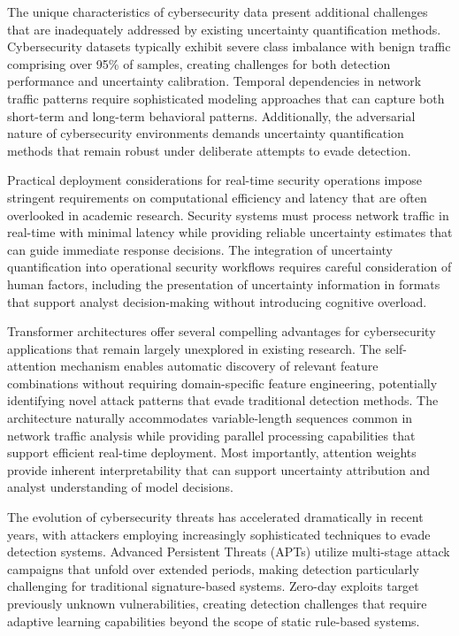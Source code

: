 \documentclass[journal]{IEEEtran}
\begin{document}
The unique characteristics of cybersecurity data present additional challenges that are inadequately addressed by existing uncertainty quantification methods. Cybersecurity datasets typically exhibit severe class imbalance with benign traffic comprising over 95\% of samples, creating challenges for both detection performance and uncertainty calibration. Temporal dependencies in network traffic patterns require sophisticated modeling approaches that can capture both short-term and long-term behavioral patterns. Additionally, the adversarial nature of cybersecurity environments demands uncertainty quantification methods that remain robust under deliberate attempts to evade detection.

Practical deployment considerations for real-time security operations impose stringent requirements on computational efficiency and latency that are often overlooked in academic research. Security systems must process network traffic in real-time with minimal latency while providing reliable uncertainty estimates that can guide immediate response decisions. The integration of uncertainty quantification into operational security workflows requires careful consideration of human factors, including the presentation of uncertainty information in formats that support analyst decision-making without introducing cognitive overload.

Transformer architectures offer several compelling advantages for cybersecurity applications that remain largely unexplored in existing research. The self-attention mechanism enables automatic discovery of relevant feature combinations without requiring domain-specific feature engineering, potentially identifying novel attack patterns that evade traditional detection methods. The architecture naturally accommodates variable-length sequences common in network traffic analysis while providing parallel processing capabilities that support efficient real-time deployment. Most importantly, attention weights provide inherent interpretability that can support uncertainty attribution and analyst understanding of model decisions.

The evolution of cybersecurity threats has accelerated dramatically in recent years, with attackers employing increasingly sophisticated techniques to evade detection systems. Advanced Persistent Threats (APTs) utilize multi-stage attack campaigns that unfold over extended periods, making detection particularly challenging for traditional signature-based systems. Zero-day exploits target previously unknown vulnerabilities, creating detection challenges that require adaptive learning capabilities beyond the scope of static rule-based systems.
\end{document}
